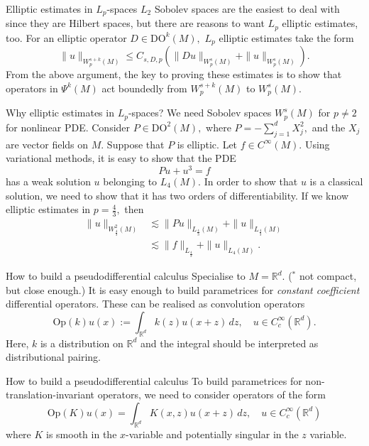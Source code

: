 \documentclass{beamer}
\numberwithin{equation}{section}
\theoremstyle{plain}
\theoremstyle{plain}
\theoremstyle{definition}
\theoremstyle{plain}
\theoremstyle{plain}
\theoremstyle{definition}
\newcommand{\Rl}{\mathbb{R}}
\newcommand{\Op}{\mathrm{Op}}
\begin{document}
\begin{frame}{Elliptic estimates in $L_p$-spaces}
    $L_2$ Sobolev spaces are the easiest to deal with since they are Hilbert spaces, but there are reasons to want $L_p$ elliptic estimates, too. For an elliptic operator $D\in \mathrm{DO}^k(M),$ $L_p$ elliptic estimates take the form
    \[
        \|u\|_{W^{s+k}_p(M)} \leq C_{s,D,p}(\|Du\|_{W^{s}_p(M)}+\|u\|_{W^{s}_p(M)}).
    \]
    \pause
    From the above argument, the key to proving these estimates is to show that operators in $\Psi^k(M)$ act boundedly from $W^{s+k}_p(M)$
    to $W^{s}_p(M).$
\end{frame}

\begin{frame}{Why elliptic estimates in $L_p$-spaces?}
    We need Sobolev spaces $W^s_p(M)$ for $p\neq 2$ for nonlinear PDE. 
    \pause
    Consider $P\in \mathrm{DO}^2(M),$ where $P = -\sum_{j=1}^d X_j^2,$ and the $X_j$ are vector fields on $M.$ Suppose that $P$ is elliptic.
    \pause
    Let $f \in C^\infty(M).$ Using variational methods, it is easy to show that the PDE
    \[
        Pu+u^3 = f
    \]
    has a weak solution $u$ belonging to $L_4(M).$ In order to show that $u$ is a classical solution, we need to show that it has two orders of differentiability.
    \pause
    If we know elliptic estimates in $p=\frac{4}{3},$ then
    \begin{align*}
        \|u\|_{W^2_{\frac{4}{3}}(M)} &\lesssim \|Pu\|_{L_{\frac{4}{3}}(M)}+\|u\|_{L_{\frac{4}{3}}(M)}\\
                                     &\lesssim \|f\|_{L_{\frac{4}{3}}}+\|u\|_{L_4(M)}.
    \end{align*}
\end{frame}

\begin{frame}{How to build a pseudodifferential calculus}
    Specialise to $M = \Rl^d.$ \pause ($^*$ not compact, but close enough.)
    \pause
    It is easy enough to build parametrices for \emph{constant coefficient} differential operators. These can be realised as convolution operators
    \[
        \Op(k)u(x) := \int_{\Rl^d} k(z)u(x+z)\,dz,\quad u\in C^\infty_c(\Rl^d).
    \]
    Here, $k$ is a distribution on $\Rl^d$ and the integral should be interpreted as distributional pairing.
\end{frame}

\begin{frame}{How to build a pseudodifferential calculus}
    To build parametrices for non-translation-invariant operators, we need to consider operators of the form
    \[
        \Op(K)u(x) = \int_{\Rl^d} K(x,z)u(x+z)\, dz,\quad u\in C^\infty_c(\Rl^d)
    \]
    where $K$ is smooth in the $x$-variable and potentially singular in the $z$ variable.
\end{frame}
\end{document}
